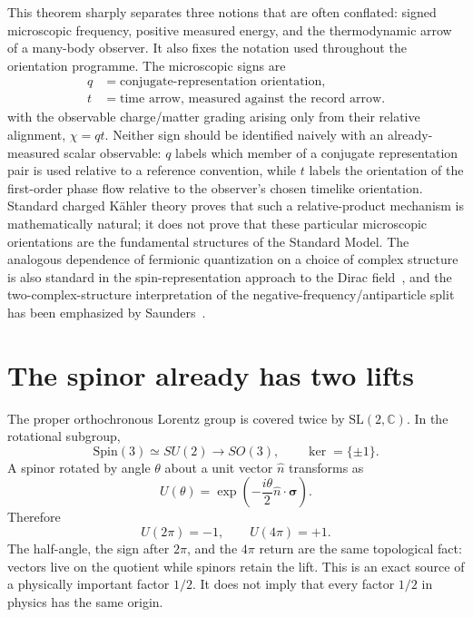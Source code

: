 \documentclass[11pt]{article}
\theoremstyle{definition}\newtheorem{definition}[theorem]{Definition}
\theoremstyle{remark}\newtheorem{remark}[theorem]{Remark}\newtheorem{conjecture}[theorem]{Conjecture}
\begin{document}
This theorem sharply separates three notions that are often conflated: signed microscopic frequency, positive measured energy, and the thermodynamic arrow of a many-body observer. It also fixes the notation used throughout the orientation programme. The microscopic signs are
\begin{equation}\label{eq:gaugeTimeAlignmentDictionary}
 \begin{aligned}
 q&=\text{conjugate-representation orientation},\\
 t&=\text{time arrow, measured against the record arrow}.
 \end{aligned}
\end{equation}
with the observable charge/matter grading arising only from their relative alignment, $\chi=qt$. Neither sign should be identified naively with an already-measured scalar observable: $q$ labels which member of a conjugate representation pair is used relative to a reference convention, while $t$ labels the orientation of the first-order phase flow relative to the observer's chosen timelike orientation. Standard charged K\"ahler theory proves that such a relative-product mechanism is mathematically natural; it does not prove that these particular microscopic orientations are the fundamental structures of the Standard Model. The analogous dependence of fermionic quantization on a choice of complex structure is also standard in the spin-representation approach to the Dirac field~\cite{GraciaBondiaVarilly1994}, and the two-complex-structure interpretation of the negative-frequency/antiparticle split has been emphasized by Saunders~\cite{Saunders1991}.

\section{The spinor already has two lifts}
The proper orthochronous Lorentz group is covered twice by $\mathrm{SL}(2,\mathbb C)$. In the rotational subgroup,
\begin{equation}
 \mathrm{Spin}(3)\simeq SU(2)\longrightarrow SO(3),\qquad \ker=\{\pm1\}.
\end{equation}
A spinor rotated by angle $\theta$ about a unit vector $\hat n$ transforms as
\begin{equation}
 U(\theta)=\exp\!\left(-\frac{i\theta}{2}\hat n\cdot\bm\sigma\right).
\end{equation}
Therefore
\begin{equation}
 U(2\pi)=-1,\qquad U(4\pi)=+1.
\end{equation}
The half-angle, the sign after $2\pi$, and the $4\pi$ return are the same topological fact: vectors live on the quotient while spinors retain the lift. This is an exact source of a physically important factor $1/2$. It does not imply that every factor $1/2$ in physics has the same origin.
\end{document}
